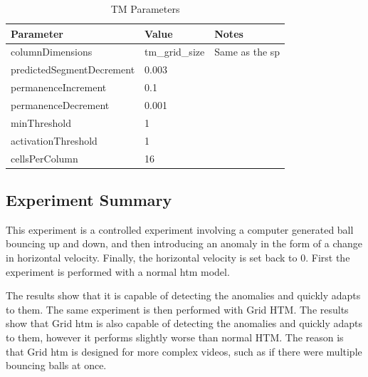 \begin{table}[H]
    \centering
    \begin{tabularx}{\linewidth}{@{}XlX@{}}
        \toprule
        \textbf{Parameter}        & \textbf{Value} & \textbf{Notes}        \\
        \midrule
        columnDimensions          & tm\_grid\_size & Same as the \gls*{sp} \\
        predictedSegmentDecrement & 0.003          &                       \\
        permanenceIncrement       & 0.1            &                       \\
        permanenceDecrement       & 0.001          &                       \\
        minThreshold              & 1              &                       \\
        activationThreshold       & 1              &                       \\
        cellsPerColumn            & 16             &                       \\
        \bottomrule
    \end{tabularx}
    \caption{TM Parameters}
    \label{tab:bb_tm_gridhtm_param}
\end{table}
\subsection{Experiment Summary}
This experiment is a controlled experiment involving a computer generated ball bouncing up and down, and then introducing an anomaly in the form of a change in horizontal velocity. Finally, the horizontal velocity is set back to 0. First the experiment is performed with a normal \gls*{htm} model.
\par
The results show that it is capable of detecting the anomalies and quickly adapts to them. The same experiment is then performed with Grid HTM. The results show that Grid \gls*{htm} is also capable of detecting the anomalies and quickly adapts to them, however it performs slightly worse than normal HTM. The reason is that Grid \gls*{htm} is designed for more complex videos, such as if there were multiple bouncing balls at once.
\clearpage
